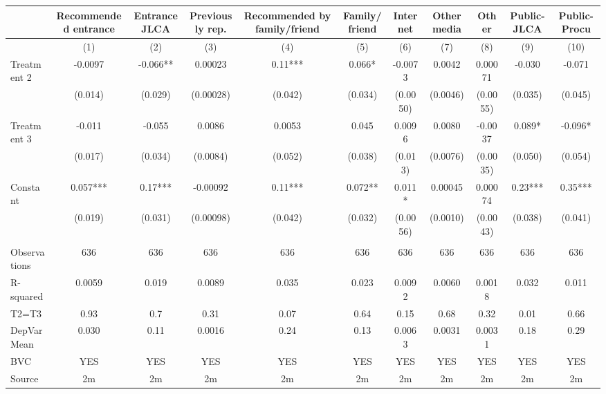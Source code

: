 \begin{tabular}{lcccccccccc}
\toprule
      & Recommended entrance & Entrance JLCA & Previously rep. & Recommended by family/friend & Family/friend & Internet & Other media & Other & Public-JLCA & Public-Procu \\
\midrule
\midrule
      & (1)   & (2)   & (3)   & (4)   & (5)   & (6)   & (7)   & (8)   & (9)   & (10) \\
\midrule
\midrule
Treatment 2 & -0.0097 & -0.066** & 0.00023 & 0.11*** & 0.066* & -0.0073 & 0.0042 & 0.00071 & -0.030 & -0.071 \\
      & (0.014) & (0.029) & (0.00028) & (0.042) & (0.034) & (0.0050) & (0.0046) & (0.0055) & (0.035) & (0.045) \\
Treatment 3 & -0.011 & -0.055 & 0.0086 & 0.0053 & 0.045 & 0.0096 & 0.0080 & -0.0037 & 0.089* & -0.096* \\
      & (0.017) & (0.034) & (0.0084) & (0.052) & (0.038) & (0.013) & (0.0076) & (0.0035) & (0.050) & (0.054) \\
Constant & 0.057*** & 0.17*** & -0.00092 & 0.11*** & 0.072** & 0.011* & 0.00045 & 0.00074 & 0.23*** & 0.35*** \\
      & (0.019) & (0.031) & (0.00098) & (0.042) & (0.032) & (0.0056) & (0.0010) & (0.0043) & (0.038) & (0.041) \\
      &       &       &       &       &       &       &       &       &       &  \\
\midrule
Observations & 636   & 636   & 636   & 636   & 636   & 636   & 636   & 636   & 636   & 636 \\
R-squared & 0.0059 & 0.019 & 0.0089 & 0.035 & 0.023 & 0.0092 & 0.0060 & 0.0018 & 0.032 & 0.011 \\
T2=T3 & 0.93  & 0.7   & 0.31  & 0.07  & 0.64  & 0.15  & 0.68  & 0.32  & 0.01  & 0.66 \\
DepVarMean & 0.030 & 0.11  & 0.0016 & 0.24  & 0.13  & 0.0063 & 0.0031 & 0.0031 & 0.18  & 0.29 \\
BVC   & YES   & YES   & YES   & YES   & YES   & YES   & YES   & YES   & YES   & YES \\
Source & 2m    & 2m    & 2m    & 2m    & 2m    & 2m    & 2m    & 2m    & 2m    & 2m \\
\bottomrule
\bottomrule
\end{tabular}%
